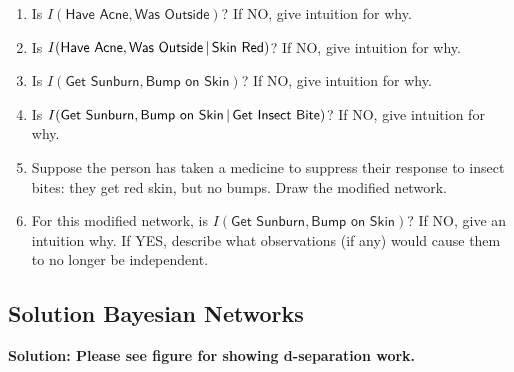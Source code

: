 \documentclass[submit]{harvardml}
\newcommand{\attr}[1]{\textsf{#1}}
\begin{document}
\begin{problem}
%
\begin{enumerate}
    \item Is $I(\attr{Have Acne},\attr{Was Outside})$? If NO, give
        intuition for why.
    \item Is $I(\attr{Have Acne},\attr{Was Outside}\given \attr{Skin Red})$? If NO, give
        intuition for why.
    \item Is $I(\attr{Get Sunburn},\attr{Bump on Skin})$? If NO, give
        intuition for why.
    \item Is $I(\attr{Get Sunburn},\attr{Bump on Skin}\given \attr{Get Insect Bite})$? If NO, give intuition for why.
    \item Suppose the person has taken a medicine to suppress their
        response to insect bites: they get red skin, but no bumps.  Draw the
        modified network.  
    \item For this modified network, is $I(\attr{Get Sunburn},\attr{Bump
        on Skin})$? If NO, give an intuition why.  If YES, describe what
        observations (if any) would cause them to no longer be independent.    
\end{enumerate}
\end{problem}

\newpage

\subsection*{Solution Bayesian Networks}
    \textbf{Solution: Please see figure for showing d-separation work.}
\end{document}
